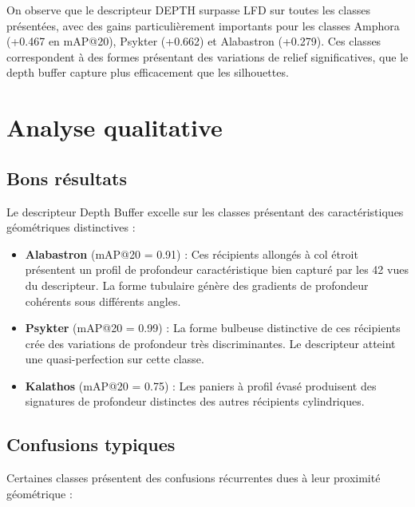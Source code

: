 \documentclass[11pt,a4paper,oneside]{report}
\begin{document}
On observe que le descripteur DEPTH surpasse LFD sur toutes les classes présentées, avec des gains particulièrement importants pour les classes Amphora (+0.467 en mAP@20), Psykter (+0.662) et Alabastron (+0.279). Ces classes correspondent à des formes présentant des variations de relief significatives, que le depth buffer capture plus efficacement que les silhouettes.

\section{Analyse qualitative}

\subsection{Bons résultats}

Le descripteur Depth Buffer excelle sur les classes présentant des caractéristiques géométriques distinctives :

\begin{itemize}
\item \textbf{Alabastron} (mAP@20 = 0.91) : Ces récipients allongés à col étroit présentent un profil de profondeur caractéristique bien capturé par les 42 vues du descripteur. La forme tubulaire génère des gradients de profondeur cohérents sous différents angles.

\item \textbf{Psykter} (mAP@20 = 0.99) : La forme bulbeuse distinctive de ces récipients crée des variations de profondeur très discriminantes. Le descripteur atteint une quasi-perfection sur cette classe.

\item \textbf{Kalathos} (mAP@20 = 0.75) : Les paniers à profil évasé produisent des signatures de profondeur distinctes des autres récipients cylindriques.
\end{itemize}

\subsection{Confusions typiques}

Certaines classes présentent des confusions récurrentes dues à leur proximité géométrique :
\end{document}
